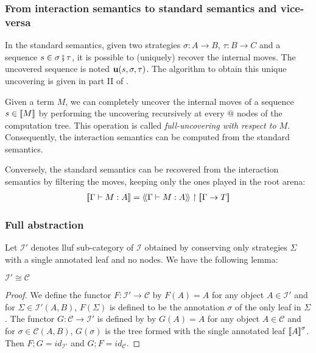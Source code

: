 \subsubsection{From interaction semantics to standard semantics and vice-versa}

In the standard semantics, given two strategies $\sigma : A \rightarrow B$, $\tau : B \rightarrow C$ and
a sequence $s \in \sigma \fatsemi \tau$, it is possible to (uniquely) recover the internal moves. The uncovered sequence is noted
 ${\bf u}(s, \sigma, \tau)$. The algorithm to obtain this unique uncovering is given in part II of \cite{hylandong_pcf}.

Given a term $M$, we can completely uncover the internal moves of a sequence $s\in{[\![M ]\!]}$
by performing the uncovering recursively at every $@$ nodes of the computation tree.
This operation is called \emph{full-uncovering with respect to $M$}.
Consequently, the interaction semantics can be computed from the standard semantics.

Conversely, the standard semantics can be recovered from the interaction semantics by filtering the moves, keeping only the ones played
in the root arena:
\begin{eqnarray}
 {[\![\Gamma \vdash M : A ]\!]} = {\langle\!\langle \Gamma \vdash M : A \rangle\!\rangle} \upharpoonright {[\![\Gamma \rightarrow T ]\!]} \label{eqn:int_std_gamsem}
\end{eqnarray}


\subsubsection{Full abstraction}

Let $\mathcal{I'}$ denotes lluf sub-category of $\mathcal{I}$ obtained by conserving only strategies $\Sigma$ with a single
annotated leaf and no nodes. We have the following lemma:
\begin{lem}
$\mathcal{I'} \cong \mathcal{C}$
\end{lem}
\begin{proof}
We define the functor $F:\mathcal{I'} \rightarrow \mathcal{C}$
by $F(A) = A$ for any object $A\in \mathcal{I'}$ and for $\Sigma \in \mathcal{I'}(A,B)$,
$F(\Sigma)$ is defined to be the annotation $\sigma$ of the only leaf in $\Sigma$.
The functor $G:\mathcal{C} \rightarrow \mathcal{I'}$ is defined by
by $G(A) = A$ for any object $A\in \mathcal{C}$ and for $\sigma \in \mathcal{C}(A,B)$,
$G(\sigma)$ is the tree formed with the single annotated leaf ${[\![ A ]\!]}^\sigma$.
Then $F;G =id_{\mathcal{I'}}$ and $G;F =id_{\mathcal{C}}$.
\end{proof}

